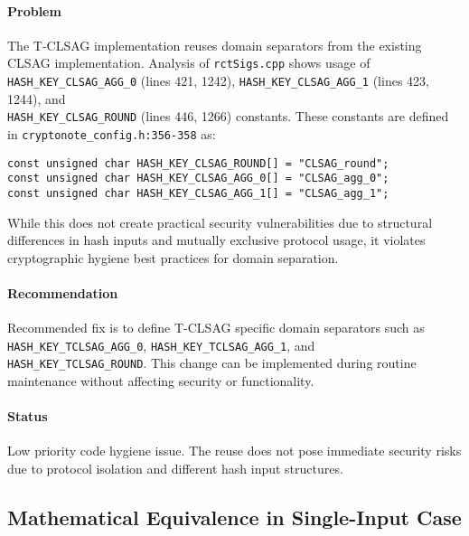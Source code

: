 \documentclass{article}
\begin{document}
\paragraph{Problem}
The T-CLSAG implementation reuses domain separators from the existing CLSAG 
implementation.  Analysis of \texttt{rctSigs.cpp} shows usage of 
\texttt{HASH\_KEY\_CLSAG\_AGG\_0} (lines 421, 1242), \texttt{HASH\_KEY\_CLSAG\_AGG\_1} (lines 423, 1244), and \\
\texttt{HASH\_KEY\_CLSAG\_ROUND} (lines 446, 1266) constants.  These constants are defined in 
\texttt{cryptonote\_config.h:356-358} as:
\begin{verbatim}
const unsigned char HASH_KEY_CLSAG_ROUND[] = "CLSAG_round";
const unsigned char HASH_KEY_CLSAG_AGG_0[] = "CLSAG_agg_0";
const unsigned char HASH_KEY_CLSAG_AGG_1[] = "CLSAG_agg_1";
\end{verbatim}
While this does not create practical security vulnerabilities due to structural differences in hash 
inputs and mutually exclusive protocol usage, it violates cryptographic 
hygiene best practices for domain separation.

\paragraph{Recommendation}
Recommended fix is to define T-CLSAG specific domain separators such as 
\texttt{HASH\_KEY\_TCLSAG\_AGG\_0}, \texttt{HASH\_KEY\_TCLSAG\_AGG\_1}, and \\
\texttt{HASH\_KEY\_TCLSAG\_ROUND}.  This change can be implemented during 
routine maintenance without affecting security or functionality.

\paragraph{Status}
Low priority code hygiene issue.  The reuse does not pose immediate security 
risks due to protocol isolation and different hash input structures.

\subsection{Mathematical Equivalence in Single-Input Case}
\end{document}
